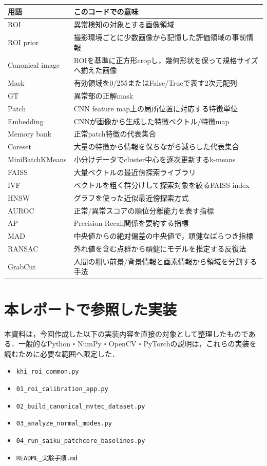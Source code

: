 \documentclass[a4paper,11pt]{ltjsreport}
\begin{document}
\begin{longtable}{L{38mm} L{105mm}}
\toprule
用語 & このコードでの意味 \\
\midrule
ROI & 異常検知の対象とする画像領域 \\
ROI prior & 撮影環境ごとに少数画像から記憶した評価領域の事前情報 \\
Canonical image & ROIを基準に正方形cropし，幾何形状を保って規格サイズへ揃えた画像 \\
Mask & 有効領域を0/255またはFalse/Trueで表す2次元配列 \\
GT & 異常部の正解mask \\
Patch & CNN feature map上の局所位置に対応する特徴単位 \\
Embedding & CNNが画像から生成した特徴ベクトル/特徴map \\
Memory bank & 正常patch特徴の代表集合 \\
Coreset & 大量の特徴から情報を保ちながら減らした代表集合 \\
MiniBatchKMeans & 小分けデータでcluster中心を逐次更新するk-means \\
FAISS & 大量ベクトルの最近傍探索ライブラリ \\
IVF & ベクトルを粗く群分けして探索対象を絞るFAISS index \\
HNSW & グラフを使った近似最近傍探索方式 \\
AUROC & 正常/異常スコアの順位分離能力を表す指標 \\
AP & Precision-Recall関係を要約する指標 \\
MAD & 中央値からの絶対偏差の中央値で，頑健なばらつき指標 \\
RANSAC & 外れ値を含む点群から頑健にモデルを推定する反復法 \\
GrabCut & 人間の粗い前景/背景情報と画素情報から領域を分割する手法 \\
\bottomrule
\end{longtable}

\chapter{本レポートで参照した実装}
本資料は，今回作成した以下の実装内容を直接の対象として整理したものである．一般的なPython・NumPy・OpenCV・PyTorchの説明は，これらの実装を読むために必要な範囲へ限定した．

\begin{itemize}
\item \texttt{khi\_roi\_common.py}
\item \texttt{01\_roi\_calibration\_app.py}
\item \texttt{02\_build\_canonical\_mvtec\_dataset.py}
\item \texttt{03\_analyze\_normal\_modes.py}
\item \texttt{04\_run\_saiku\_patchcore\_baselines.py}
\item \texttt{README\_実験手順.md}
\end{itemize}
\end{document}
